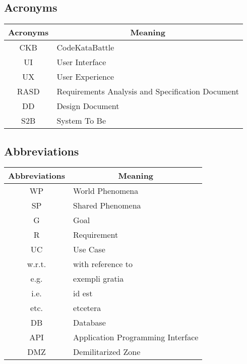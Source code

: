 \subsection{Acronyms}
\begin{table}[H]
    \centering
    \begin{tabular}{|c|l|}
    \hline
    \rowcolor[HTML]{B8C8D5} 
    \textbf{Acronyms} & \multicolumn{1}{c|}{\cellcolor[HTML]{B8C8D5}\textbf{Meaning}} \\ \hline
    CKB & CodeKataBattle  \\ \hline
    UI & User Interface  \\ \hline
    UX & User Experience  \\ \hline
    RASD & Requirements Analysis and Specification Document  \\ \hline
    DD & Design Document  \\ \hline
    S2B & System To Be \\ \hline
    \end{tabular}
\end{table}

\subsection{Abbreviations}
\begin{table}[H]
    \centering
    \begin{tabular}{|c|l|}
    \hline
    \rowcolor[HTML]{B8C8D5} 
    \textbf{Abbreviations} & \multicolumn{1}{c|}{\cellcolor[HTML]{B8C8D5}\textbf{Meaning}} \\ \hline
    WP & World Phenomena  \\ \hline
    SP & Shared Phenomena \\ \hline
    G  & Goal             \\ \hline
    R  & Requirement             \\ \hline
    UC  & Use Case             \\ \hline
    w.r.t. & with reference to \\ \hline
    e.g. & exempli gratia \\ \hline
    i.e. & id est \\ \hline
    etc. & etcetera \\ \hline
    DB & Database \\ \hline
    API & Application Programming Interface \\ \hline
    DMZ & Demilitarized Zone \\ \hline
    \end{tabular}
\end{table}


